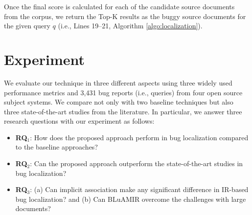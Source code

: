 \documentclass[sigconf,review,anonymous]{acmart}
\begin{document}
Once the final score is calculated for each of the candidate source documents from the corpus, we return the Top-K results as the buggy source documents for the given query $q$ (i.e.,  Lines 19--21, Algorithm \ref{algo:localization}).

\section{Experiment} \label{sec:expANDdiss}
We evaluate our technique in three different aspects using
three widely used performance metrics and 3,431 bug reports (i.e.,
queries) from four open source subject systems. We compare not only with two baseline techniques \cite{vector-space-model,MarcusLSI} but also three state-of-the-art studies \cite{Nguyen,Jian,Saha} from the literature. In particular, we answer three research questions with our experiment as follows: 
\begin{itemize}
	\item \textbf{RQ$_1$}: How does the proposed approach perform in bug localization compared to the baseline approaches? 
	\item \textbf{RQ$_2$}: Can the proposed approach outperform the state-of-the-art studies in bug localization?
	\item \textbf{RQ$_3$}: (a) Can implicit association make any significant difference in IR-based bug localization? and (b) Can BLuAMIR overcome the challenges with large documents?   
\end{itemize}

\begin{table}[!tb]
	\caption{Experimental Dataset}
	\label{tab:DDSl}
	\vspace{-.3cm}
\end{table}
\end{document}

